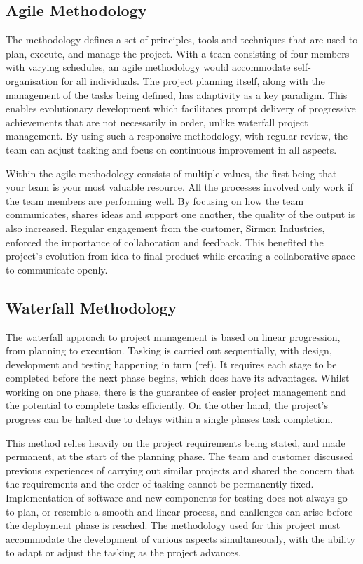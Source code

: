 \documentclass [12pt]{article}
\begin{document}
\subsection{Agile Methodology}\label{sec:agile}
The methodology defines a set of principles, tools and techniques that are used to plan, execute, and manage the project. With a team consisting of four members with varying schedules, an agile methodology would accommodate self-organisation for all individuals. The project planning itself, along with the management of the tasks being defined, has adaptivity as a key paradigm. This enables evolutionary development which facilitates prompt delivery of progressive achievements that are not necessarily in order, unlike waterfall project management. By using such a responsive methodology, with regular review, the team can adjust tasking and focus on continuous improvement in all aspects.

Within the agile methodology consists of multiple values, the first being that your team is your most valuable resource. All the processes involved only work if the team members are performing well. By focusing on how the team communicates, shares ideas and support one another, the quality of the output is also increased. Regular engagement from the customer, Sirmon Industries, enforced the importance of collaboration and feedback. This benefited the project's evolution from idea to final product while creating a collaborative space to communicate openly.

\subsection{Waterfall Methodology}\label{sec:waterfall}
The waterfall approach to project management is based on linear progression, from planning to execution. Tasking is carried out sequentially, with design, development and testing happening in turn (ref). It requires each stage to be completed before the next phase begins, which does have its advantages. Whilst working on one phase, there is the guarantee of easier project management and the potential to complete tasks efficiently. On the other hand, the project’s progress can be halted due to delays within a single phases task completion.

This method relies heavily on the project requirements being stated, and made permanent, at the start of the planning phase. The team and customer discussed previous experiences of carrying out similar projects and shared the concern that the requirements and the order of tasking cannot be permanently fixed.  Implementation of software and new components for testing does not always go to plan, or resemble a smooth and linear process, and challenges can arise before the deployment phase is reached. The methodology used for this project must accommodate the development of various aspects simultaneously, with the ability to adapt or adjust the tasking as the project advances.
\end{document}

